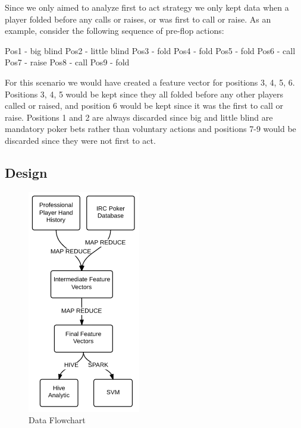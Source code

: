\documentclass[twoside]{article}
\begin{document}
\begin{multicols}{2}
Since we only aimed to analyze first to act strategy we only kept data when a player folded before any calls or raises, or was first to call or raise. As an example, consider the following sequence of pre-flop actions: \newline

Pos1 - big blind\newline
\indent Pos2 - little blind\newline
\indent Pos3 - fold\newline
\indent Pos4 - fold\newline
\indent Pos5 - fold\newline
\indent Pos6 - call\newline
\indent Pos7 - raise\newline
\indent Pos8 - call\newline
\indent Pos9 - fold\newline

For this scenario we would have created a feature vector for positions 3, 4, 5, 6. Positions 3, 4, 5 would be kept since they all folded before any other players called or raised, and position 6 would be kept since it was the first to call or raise. 
Positions 1 and 2 are always discarded since big and little blind are mandatory poker bets rather than voluntary actions and positions 7-9 would be discarded since they were not first to act. 

\subsection{Design}

\begin{figure}[H]
  \centering
  \centerline{\includegraphics[width=0.35\columnwidth]{Flowchart.png}}
   \caption{Data Flowchart}
  \label{fig:Data flow}
\end{figure}


\end{multicols}
\end{document}
